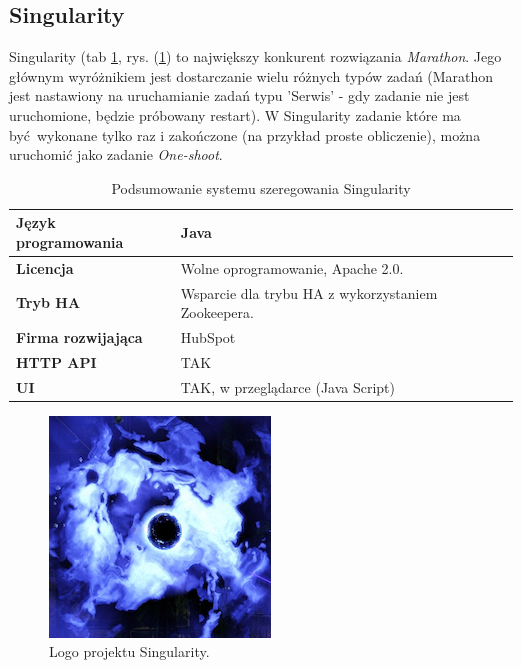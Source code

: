 \documentclass[10pt,a4paper,titlepage,twoside]{report}
\begin{document}


\subsection{Singularity}
Singularity (tab \ref{singularity_info}, rys. (\ref{singularity_logo}) to największy konkurent rozwiązania \textit{Marathon}. Jego głównym wyróżnikiem jest dostarczanie wielu różnych typów zadań (Marathon jest nastawiony na uruchamianie zadań typu 'Serwis' - gdy zadanie nie jest uruchomione, będzie próbowany restart). W Singularity zadanie które ma być wykonane tylko raz i zakończone (na przykład proste obliczenie), można uruchomić jako zadanie \textit{One-shoot}. 
\begin{table}[!h]
\caption{Podsumowanie systemu szeregowania Singularity}
\label{singularity_info}
\centering
\begin{tabular}{|p{4cm}|p{6cm}|}
  \hline
  \textbf{Język programowania} & Java \\
  \hline
  \textbf{Licencja} & Wolne oprogramowanie, Apache 2.0. \\
  \hline
  \textbf{Tryb HA} & Wsparcie dla trybu HA z wykorzystaniem Zookeepera. \\
  \hline
  \textbf{Firma rozwijająca} & HubSpot \\
  \hline
  \textbf{HTTP API} & TAK \\
  \hline
  \textbf{UI} & TAK, w przeglądarce (Java Script) \\
  \hline
\end{tabular}
\end{table}

\begin{figure}[!h]
	\centering
	\includegraphics[scale=0.5]{pics/singularity.png}
	\caption{Logo projektu Singularity.}
	\label{singularity_logo}
\end{figure}
\end{document}
